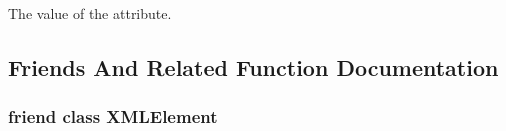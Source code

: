 The value of the attribute. 



\subsection{Friends And Related Function Documentation}
\hypertarget{classtinyxml2_1_1_x_m_l_attribute_ac2fba9b6e452829dd892f7392c24e0eb}{
\subsubsection[{X\-M\-L\-Element}]{\setlength{\rightskip}{0pt plus 5cm}friend class {\bf X\-M\-L\-Element}\hspace{0.3cm}{\ttfamily [friend]}}}\label{classtinyxml2_1_1_x_m_l_attribute_ac2fba9b6e452829dd892f7392c24e0eb}


